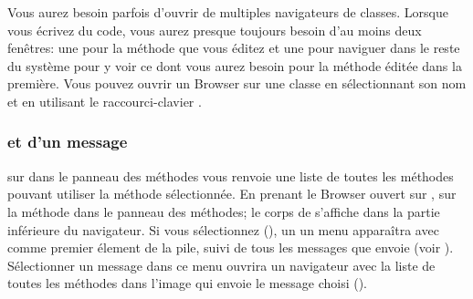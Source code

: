 \documentclass[a4paper,10pt,twoside]{book}
\begin{document}
Vous aurez besoin parfois d'ouvrir de multiples navigateurs de classes.
Lorsque vous écrivez du code, vous aurez presque toujours besoin d'au moins deux
fenêtres: une pour la méthode que vous éditez et une pour naviguer
dans le reste du système pour y voir ce dont vous aurez besoin pour la
méthode éditée dans la première. %
Vous pouvez ouvrir un Browser sur une classe en sélectionnant son nom et en
utilisant le raccourci-clavier  .


\subsubsection{\Senders et \implementors d'un message}


\Actclick sur  dans le
panneau des méthodes vous renvoie une liste de toutes les méthodes
pouvant utiliser la méthode sélectionnée. En prenant le Browser
ouvert sur , \clickz sur la méthode  
dans le panneau des méthodes; le corps de  s'affiche dans
la partie inférieure du navigateur.
Si vous sélectionnez  (), un 
un menu apparaîtra avec  comme premier élement de
la pile,  suivi de tous les messages que 
 envoie (voir ). %
Sélectionner un message dans ce menu ouvrira un navigateur avec la
liste de toutes les méthodes dans l'image qui envoie le message
choisi ().


\end{document}
